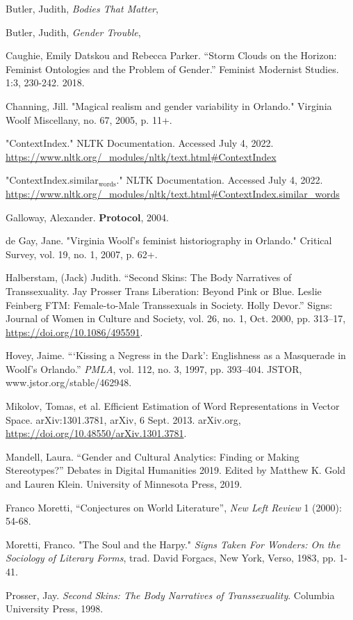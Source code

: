 \documentclass[11pt]{article}
\begin{document}
Butler, Judith, \emph{Bodies That Matter},

Butler, Judith, \emph{Gender Trouble},

Caughie, Emily Datskou and Rebecca Parker. “Storm Clouds on the
Horizon: Feminist Ontologies and the Problem of Gender.” Feminist
Modernist Studies. 1:3, 230-242. 2018.

Channing, Jill.  "Magical realism and gender variability in Orlando."
Virginia Woolf Miscellany, no. 67, 2005, p. 11+.

"ContextIndex." NLTK Documentation. Accessed July
4, 2022. \url{https://www.nltk.org/\_modules/nltk/text.html\#ContextIndex}

"ContextIndex.similar\(_{\text{words}}\)." NLTK Documentation. Accessed July
4, 2022. \url{https://www.nltk.org/\_modules/nltk/text.html\#ContextIndex.similar\_words}

Galloway, Alexander. \textbf{Protocol}, 2004.

de Gay, Jane. "Virginia Woolf's feminist historiography in Orlando."
Critical Survey, vol. 19, no. 1, 2007, p. 62+.

Halberstam, (Jack) Judith. “Second Skins: The Body Narratives of
Transsexuality. Jay Prosser Trans Liberation: Beyond Pink or
Blue. Leslie Feinberg FTM: Female-to-Male Transsexuals in
Society. Holly Devor.” Signs: Journal of Women in Culture and Society,
vol. 26, no. 1, Oct. 2000, pp. 313–17, \url{https://doi.org/10.1086/495591}.

Hovey, Jaime. “‘Kissing a Negress in the Dark’: Englishness as a
Masquerade in Woolf's Orlando.” \emph{PMLA}, vol. 112, no. 3, 1997,
pp. 393–404. JSTOR, www.jstor.org/stable/462948.

Mikolov, Tomas, et al. Efficient Estimation of Word Representations in
Vector Space. arXiv:1301.3781, arXiv, 6 Sept. 2013. arXiv.org,
\url{https://doi.org/10.48550/arXiv.1301.3781}.

Mandell, Laura. “Gender and Cultural Analytics: Finding or
Making Stereotypes?” Debates in Digital Humanities 2019. Edited by
Matthew K. Gold and Lauren Klein. University of Minnesota Press, 2019.

Franco Moretti, “Conjectures on World Literature”, \emph{New Left Review} 1
(2000): 54-68.

Moretti, Franco. "The Soul and the Harpy." \emph{Signs Taken For
Wonders: On the Sociology of Literary Forms}, trad. David Forgacs, New
York, Verso, 1983, pp. 1-41.

Prosser, Jay. \emph{Second Skins: The Body Narratives of
Transsexuality}. Columbia University Press, 1998.
\end{document}
